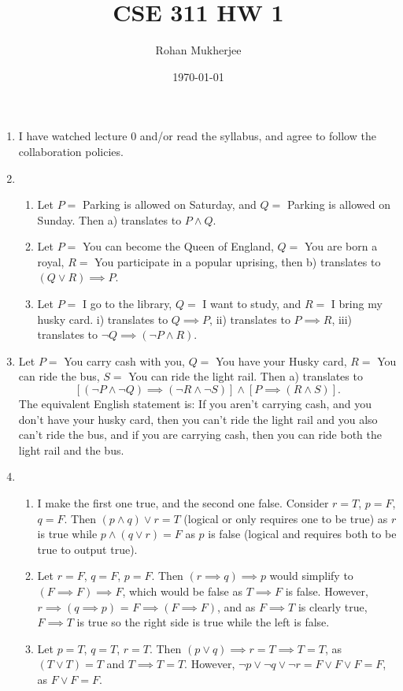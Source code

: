 \documentclass[12pt]{article}
\title{CSE 311 HW 1}
\date{\today}
\author{Rohan Mukherjee}
\theoremstyle{definition}
\theoremstyle{remark}
\begin{document}
	\maketitle
	\begin{enumerate}[leftmargin=\labelsep]
		\item I have watched lecture 0 and/or read the syllabus, and agree to follow the collaboration policies.
		
		\newpage
		\item 
		\begin{enumerate}
			\item Let $P=$ Parking is allowed on Saturday, and $Q=$ Parking is allowed on Sunday. Then a) translates to $P\land Q$.
			\item Let $P=$ You can become the Queen of England, $Q=$ You are born a royal, $R=$ You participate in a popular uprising, then b) translates to $(Q \lor R) \implies P$.
			\item Let $P=$ I go to the library, $Q=$ I want to study, and $R=$ I bring my husky card. i) translates to $Q \implies P$, ii) translates to $P \implies R$, iii) translates to $\lnot Q \implies (\lnot P \land R)$.
		\end{enumerate}
	
	\newpage
	\item Let $P=$ You carry cash with you, $Q=$ You have your Husky card, $R=$ You can ride the bus, $S=$ You can ride the light rail. Then a) translates to $$\left [(\lnot P \land \lnot Q) \implies (\lnot R \land \lnot S)\right ] \land \left [P \implies (R \land S)\right ].$$ The equivalent English statement is: If you aren't carrying cash, and you don't have your husky card, then you can't ride the light rail and you also can't ride the bus, and if you are carrying cash, then you can ride both the light rail and the bus.
	
	\newpage
	\item 
	\begin{enumerate}
		\item I make the first one true, and the second one false. Consider $r = T$, $p = F$, $q=F$. Then $(p \land q) \lor r = T$ (logical or only requires one to be true) as $r$ is true while $p \land (q \lor r) = F$ as $p$ is false (logical and requires both to be true to output true).
		\item Let $r=F$, $q=F$, $p=F$. Then $(r \implies q) \implies p$ would simplify to $(F \implies F) \implies F$, which would be false as $T \implies F$ is false. However, $r \implies (q \implies p)$ = $F \implies (F \implies F)$, and as $F \implies T$ is clearly true, $F \implies T$ is true so the right side is true while the left is false. 
		\item Let $p=T$, $q=T$, $r=T$. Then $(p \lor q) \implies r = T \implies T = T$, as $(T \lor T) = T$ and $T \implies T = T$. However, $\lnot p \lor \lnot q \lor \lnot r = F \lor F \lor F = F$, as $F \lor F = F$.
	\end{enumerate}
	

\end{enumerate}
\end{document}

